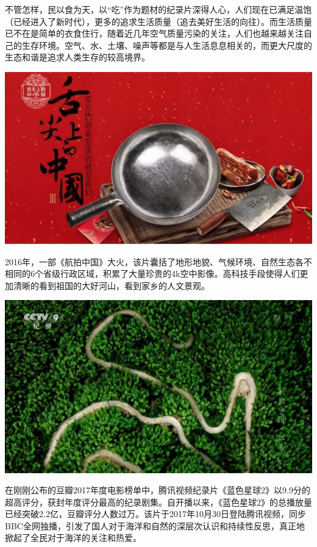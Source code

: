 \documentclass[]{book}
\begin{document}
不管怎样，民以食为天，以``吃''作为题材的纪录片深得人心，人们现在已满足温饱（已经进入了新时代），更多的追求生活质量（追去美好生活的向往）。而生活质量已不在是简单的衣食住行，随着近几年空气质量污染的关注，人们也越来越关注自己的生存环境。空气、水、土壤、噪声等都是与人生活息息相关的，而更大尺度的生态和谐是追求人类生存的较高境界。

\includegraphics[width=8.33in]{images/xf2}

2016年，一部《航拍中国》大火，该片囊括了地形地貌、气候环境、自然生态各不相同的6个省级行政区域，积累了大量珍贵的4k空中影像。高科技手段使得人们更加清晰的看到祖国的大好河山，看到家乡的人文景观。

\includegraphics[width=8.33in]{images/xf3}

在刚刚公布的豆瓣2017年度电影榜单中，腾讯视频纪录片《蓝色星球2》以9.9分的超高评分，获封年度评分最高的纪录剧集。自开播以来，《蓝色星球2》的总播放量已经突破2.2亿，豆瓣评分人数过万。该片于2017年10月30日登陆腾讯视频，同步BBC全网独播，引发了国人对于海洋和自然的深层次认识和持续性反思，真正地掀起了全民对于海洋的关注和热爱。
\end{document}
